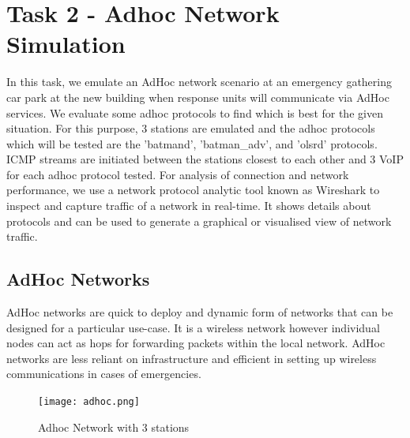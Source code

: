 \documentclass{article}
\begin{document}
\section{Task 2 - Adhoc Network Simulation}
In this task, we emulate an AdHoc network scenario at an emergency gathering car park at the new building when response units will communicate via AdHoc services. We evaluate some adhoc protocols to find which is best for the given situation. For this purpose, 3 stations are emulated and the adhoc protocols which will be tested are the 'batmand', 'batman\_adv', and 'olsrd' protocols. ICMP streams are initiated between the stations closest to each other and 3 VoIP for each adhoc protocol tested. For analysis of connection and network performance, we use a network protocol analytic tool known as Wireshark to inspect and capture traffic of a network in real-time. It shows details about protocols and can be used to generate a graphical or visualised view of network traffic.
\subsection{AdHoc Networks}
AdHoc\cite{1010101} networks are quick to deploy and dynamic form of networks that can be designed for a particular use-case. It is a wireless network however individual nodes can act as hops for forwarding packets within the local network. AdHoc networks are less reliant on infrastructure and efficient in setting up wireless communications in cases of emergencies.
    	\begin{figure}[h]
        		\centering
        		\texttt{[image: adhoc.png]}
        		\caption{Adhoc Network with 3 stations}
        		\label{fig:t2-1}
    	\end{figure}
\end{document}
